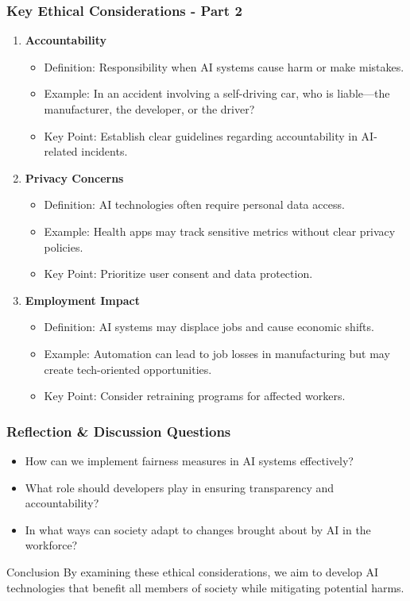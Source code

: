 \documentclass[aspectratio=169]{beamer}
\begin{document}
\begin{frame}[fragile]
    \frametitle{Key Ethical Considerations - Part 2}
    \begin{enumerate}[resume]
        \item \textbf{Accountability}
            \begin{itemize}
                \item Definition: Responsibility when AI systems cause harm or make mistakes.
                \item Example: In an accident involving a self-driving car, who is liable—the manufacturer, the developer, or the driver?
                \item Key Point: Establish clear guidelines regarding accountability in AI-related incidents.
            \end{itemize}

        \item \textbf{Privacy Concerns}
            \begin{itemize}
                \item Definition: AI technologies often require personal data access.
                \item Example: Health apps may track sensitive metrics without clear privacy policies.
                \item Key Point: Prioritize user consent and data protection.
            \end{itemize}
        
        \item \textbf{Employment Impact}
            \begin{itemize}
                \item Definition: AI systems may displace jobs and cause economic shifts.
                \item Example: Automation can lead to job losses in manufacturing but may create tech-oriented opportunities.
                \item Key Point: Consider retraining programs for affected workers.
            \end{itemize}
    \end{enumerate}
\end{frame}

\begin{frame}[fragile]
    \frametitle{Reflection \& Discussion Questions}
    \begin{itemize}
        \item How can we implement fairness measures in AI systems effectively?
        \item What role should developers play in ensuring transparency and accountability?
        \item In what ways can society adapt to changes brought about by AI in the workforce?
    \end{itemize}
    \begin{block}{Conclusion}
        By examining these ethical considerations, we aim to develop AI technologies that benefit all members of society while mitigating potential harms. 
    \end{block}
\end{frame}
\end{document}
